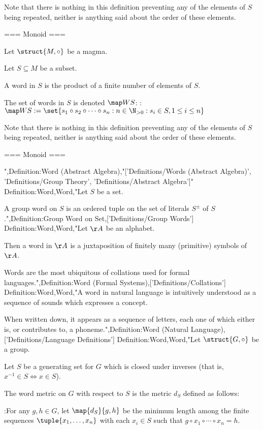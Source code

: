Note that there is nothing in this definition preventing any of the elements of $S$ being repeated, neither is anything said about the order of these elements.


=== Monoid ===

Let $\struct {M, \circ}$ be a magma.

Let $S \subseteq M$ be a subset.

A word in $S$ is the product of a finite number of elements of $S$.


The set of words in $S$ is denoted $\map W S$:
:$\map W S := \set {s_1 \circ s_2 \circ \cdots \circ s_n: n \in \N_{>0}: s_i \in S, 1 \le i \le n}$


Note that there is nothing in this definition preventing any of the elements of $S$ being repeated, neither is anything said about the order of these elements.


=== Monoid ===

",Definition:Word (Abstract Algebra),"['Definitions/Words (Abstract Algebra)', 'Definitions/Group Theory', 'Definitions/Abstract Algebra']"
Definition:Word,Word,"Let $S$ be a set.


A group word on $S$ is an ordered tuple on the set of literals $S^\pm$ of $S$.",Definition:Group Word on Set,['Definitions/Group Words']
Definition:Word,Word,"Let $\AA$ be an alphabet.


Then a word in $\AA$ is a juxtaposition of finitely many (primitive) symbols of $\AA$.

Words are the most ubiquitous of collations used for formal languages.",Definition:Word (Formal Systems),['Definitions/Collations']
Definition:Word,Word,"A word in natural language is intuitively understood as a sequence of sounds which expresses a concept.

When written down, it appears as a sequence of letters, each one of which either is, or contributes to, a phoneme.",Definition:Word (Natural Language),['Definitions/Language Definitions']
Definition:Word,Word,"Let $\struct {G, \circ}$ be a group.

Let $S$ be a generating set for $G$ which is closed under inverses (that is, $x^{-1} \in S \iff x \in S$).


The word metric on $G$ with respect to $S$ is the metric $d_S$ defined as follows:

:For any $g, h \in G$, let $\map {d_S} {g, h}$ be the minimum length among the finite sequences $\tuple {x_1, \dots, x_n}$ with each $x_i \in S$ such that $g \circ x_1 \circ \cdots \circ x_n = h$.


